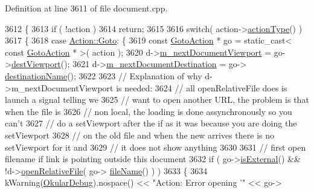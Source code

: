 Definition at line 3611 of file document.\+cpp.


\begin{DoxyCode}
3612 \{
3613     \textcolor{keywordflow}{if} ( !action )
3614         \textcolor{keywordflow}{return};
3615 
3616     \textcolor{keywordflow}{switch}( action->\hyperlink{classOkular_1_1Action_ac4c2ef09b350b4041f8d1cfb261c3234}{actionType}() )
3617     \{
3618         \textcolor{keywordflow}{case} \hyperlink{classOkular_1_1Action_abe474735af30ea76105595533df9ec47a3561c8768d2c750b59fbed36c41f336d}{Action::Goto}: \{
3619             \textcolor{keyword}{const} \hyperlink{classOkular_1_1GotoAction}{GotoAction} * go = \textcolor{keyword}{static\_cast<} \textcolor{keyword}{const }\hyperlink{classOkular_1_1GotoAction}{GotoAction} * \textcolor{keyword}{>}( action );
3620             d->\hyperlink{classOkular_1_1DocumentPrivate_af6aae2128fb788ae1693699506a86c0d}{m\_nextDocumentViewport} = go->\hyperlink{classOkular_1_1GotoAction_a98c99e66d65f81da1b25004ae6c13236}{destViewport}();
3621             d->\hyperlink{classOkular_1_1DocumentPrivate_a0c531a03865395da325584dbae6e1efe}{m\_nextDocumentDestination} = go->
      \hyperlink{classOkular_1_1GotoAction_a261f49a00494e690f18dc5a0d89ee6e1}{destinationName}();
3622 
3623             \textcolor{comment}{// Explanation of why d->m\_nextDocumentViewport is needed:}
3624             \textcolor{comment}{// all openRelativeFile does is launch a signal telling we}
3625             \textcolor{comment}{// want to open another URL, the problem is that when the file is}
3626             \textcolor{comment}{// non local, the loading is done assynchronously so you can't}
3627             \textcolor{comment}{// do a setViewport after the if as it was because you are doing the setViewport}
3628             \textcolor{comment}{// on the old file and when the new arrives there is no setViewport for it and}
3629             \textcolor{comment}{// it does not show anything}
3630 
3631             \textcolor{comment}{// first open filename if link is pointing outside this document}
3632             \textcolor{keywordflow}{if} ( go->\hyperlink{classOkular_1_1GotoAction_ace11529e3cc9ddb1f1706dd906b23f45}{isExternal}() && !d->\hyperlink{classOkular_1_1DocumentPrivate_a4853d128c2eb810795bf2cd4ca3665e2}{openRelativeFile}( go->
      \hyperlink{classOkular_1_1GotoAction_a310a286fa9e6e3cae3417d7d537274b1}{fileName}() ) )
3633             \{
3634                 kWarning(\hyperlink{debug__p_8h_af16c6e32a95969dd0605d792ec9807c7}{OkularDebug}).nospace() << \textcolor{stringliteral}{"Action: Error opening '"} << go->

\end{DoxyCode}
